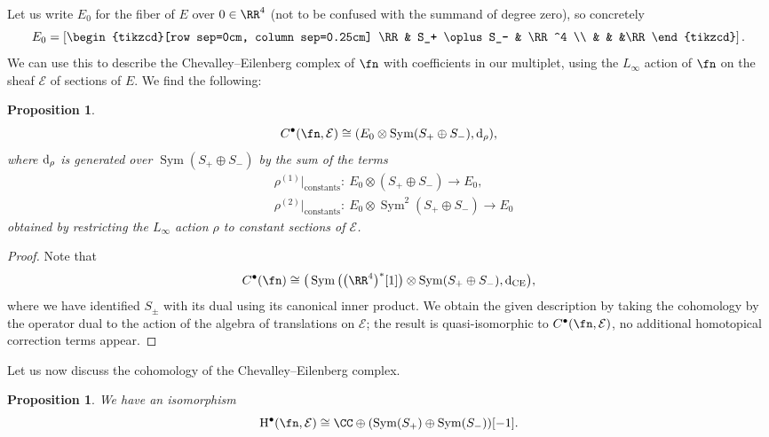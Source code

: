 \documentclass[10pt,a4paper]{amsart}
\numberwithin{equation}{section}
\newtheorem{prop}[thm]{Proposition}
{ \theoremstyle{definition}
	\newtheorem{dfn}[thm]{Definition}
	\newtheorem{Note}[thm]{Note}
	\newtheorem{eg}[thm]{Example}
	\newtheorem{rmk}[thm]{Remark} }
\def\cE{\mathcal E}\def\cF{\mathcal F}\def\cG{\mathcal G}\def\cH{\mathcal H}
\def\d{{\rm d}}
\DeclareMathOperator{\Sym}{Sym}
\begin{document}
Let us write $E_0$ for the fiber of $E$ over $0 \in \RR^4$ (not to be confused with the summand of degree zero), so concretely
\begin{equation*} %
E_0 = \left[
\begin{tikzcd}[row sep=0cm, column sep=0.25cm]
\RR & S_+ \oplus S_- & \RR^4 \\
& & &\RR
\end{tikzcd} \right] .
\end{equation*}
We can use this to describe the Chevalley--Eilenberg complex of $\fn$ with coefficients in our multiplet, using the $L_\infty$ action of $\fn$ on the sheaf $\mathcal E$ of sections of $E$. We find the following:

\begin{prop}
	\begin{equation*}
	C^\bullet(\fn, \mathcal E) \cong (E_0 \otimes \Sym(S_+ \oplus S_-), \d_\rho),
	\end{equation*}
	where $\d_\rho$ is generated over $\Sym(S_+ \oplus S_-)$ by the sum of the terms
	\begin{align*}
	&\rho^{(1)}|_{\mathrm{constants}} \colon \ E_0 \otimes (S_+ \oplus S_-) \to E_0, \\
	&\rho^{(2)}|_{\mathrm{constants}} \colon \ E_0 \otimes \Sym^2(S_+ \oplus S_-) \to E_0
	\end{align*}
	obtained by restricting the $L_\infty$ action $\rho$ to constant sections of $\mathcal E$.
\end{prop}

\begin{proof}
	Note that
	\begin{equation*}
	C^\bullet(\fn) \cong \big(\Sym\big(\big(\RR^4\big)^*[1]\big) \otimes \Sym(S_+ \oplus S_-), \d_{\mathrm{CE}}\big),
	\end{equation*}
	where we have identified $S_\pm$ with its dual using its canonical inner product. We obtain the given description by taking the cohomology by the operator dual to the action of the algebra of translations on $\mathcal E$; the result is quasi-isomorphic to $C^\bullet(\fn, \mathcal E)$, no additional homotopical correction terms appear.
\end{proof}

Let us now discuss the cohomology of the Chevalley--Eilenberg complex.

\begin{prop}
	We have an isomorphism
	\begin{equation*}
	\mathrm H^{\bullet}(\fn, \cE) \cong \CC \oplus (\Sym(S_+) \oplus \Sym(S_-))[-1].
	\end{equation*}
\end{prop}
\end{document}
